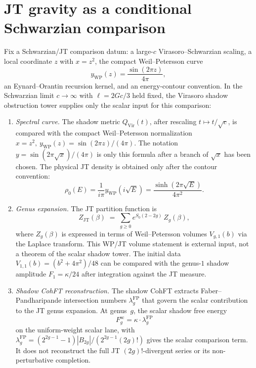 %
%

\section{JT gravity as a conditional Schwarzian comparison}
\label{sec:ent-jt}

\begin{conjecture}
\label{conj:ent-jt-shadow}
Fix a Schwarzian/JT comparison datum: a large-\(c\)
Virasoro--Schwarzian scaling, a local coordinate \(z\) with
\(x=z^2\), the compact Weil--Petersson curve
\[
y_{\mathrm{WP}}(z)=\frac{\sin(2\pi z)}{4\pi},
\]
an Eynard--Orantin recursion kernel, and an energy-contour convention.
In the Schwarzian limit \(c\to\infty\) with \(\ell=2Gc/3\) held fixed,
the Virasoro shadow obstruction tower supplies only the scalar input
for this comparison:
\begin{enumerate}[label=\textup{(\roman*)}]
\item \emph{Spectral curve.}
 The shadow metric $Q_{\mathrm{Vir}}(t)$, after rescaling
 $t \mapsto t/\sqrt{c}$, is compared with the compact
 Weil--Petersson normalization
 \(x=z^2,\ y_{\mathrm{WP}}(z)=\sin(2\pi z)/(4\pi)\).
 The notation \(y=\sin(2\pi\sqrt{x})/(4\pi)\) is only this formula
 after a branch of \(\sqrt{x}\) has been chosen.
 The physical JT density is obtained only after the contour convention:
 \[
 \rho_0(E)=\frac{1}{i\pi}y_{\mathrm{WP}}(i\sqrt E)
 =\frac{\sinh(2\pi\sqrt E)}{4\pi^2}.
 \]

\item \emph{Genus expansion.}
 The JT partition function is
 \begin{equation}\label{eq:ent-jt-genus}
 Z_{\mathrm{JT}}(\beta)
 \;=\;
 \sum_{g \ge 0}
 e^{S_0(2-2g)}\,Z_g(\beta),
 \end{equation}
 where $Z_g(\beta)$ is expressed in terms of
 Weil--Petersson volumes $V_{g,1}(b)$ via the Laplace
 transform. This WP/JT volume statement is external input, not a
 theorem of the scalar shadow tower. The initial data
 $V_{1,1}(b) = (b^2 + 4\pi^2)/48$
 can be compared with the genus-$1$ shadow amplitude $F_1 = \kappa/24$
 after integration against the JT measure.

\item \emph{Shadow CohFT reconstruction.}
The shadow CohFT extracts Faber--Pandharipande
intersection numbers $\lambda_g^{\mathrm{FP}}$ that
govern the scalar contribution to the JT genus expansion.
At genus~$g$, the scalar shadow free energy
\[
F_g^{\mathrm{sc}}
=\kappa\cdot\lambda_g^{\mathrm{FP}}
\]
on the uniform-weight scalar lane, with
 $\lambda_g^{\mathrm{FP}}
 = (2^{2g-1}-1)|B_{2g}|/(2^{2g-1}(2g)!)$
 gives the scalar comparison term. It does not reconstruct the full
 JT \((2g)!\)-divergent series or its non-perturbative completion.
\end{enumerate}
\end{conjecture}

